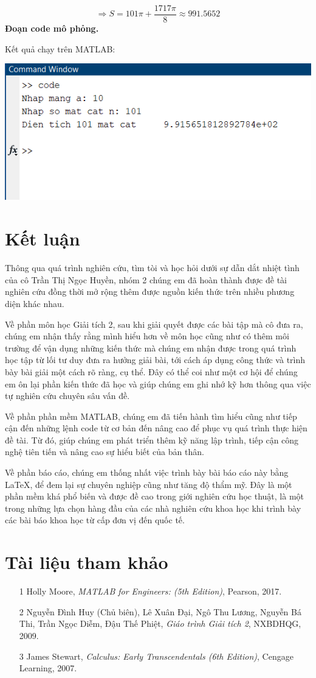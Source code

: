 \documentclass[12pt,a4paper]{article}
\begin{document}
\[
    \Rightarrow S = 101\pi + \dfrac{1717\pi}{8} \approx 991.5652   
\]
\textbf{Đoạn code mô phỏng.}

Kết quả chạy trên MATLAB: 
\begin{center}
    \includegraphics[scale = 0.8]{image.png}
\end{center}
\section{Kết luận}
Thông qua quá trình nghiên cứu, tìm tòi và học hỏi dưới sự dẫn dắt nhiệt tình của cô Trần Thị Ngọc Huyền, nhóm 2 chúng em đã hoàn thành được đề tài nghiên cứu đồng thời mở rộng thêm được nguồn kiến thức trên nhiều phương diện khác nhau.

Về phần môn học Giải tích 2, sau khi giải quyết được các bài tập mà cô đưa ra, chúng em nhận thấy rằng mình hiểu hơn về môn học cũng như có thêm môi trường để vận dụng những kiến thức mà chúng em nhận được trong quá trình học tập từ lối tư duy đưa ra hưởng giải bài, tới cách áp dụng công thức và trình bày bài giải một cách rõ ràng, cụ thể. Đây có thể coi như một cơ hội để chúng em ôn lại phần kiến thức đã học và giúp chúng em ghi nhớ kỹ hơn thông qua việc tự nghiên cứu chuyên sâu vấn đề.

Về phần phần mềm MATLAB, chúng em đã tiến hành tìm hiểu cũng như tiếp cận đến những lệnh code từ cơ bản đến nâng cao để phục vụ quá trình thực hiện đề tài. Từ đó, giúp chúng em phát triển thêm kỹ năng lập trình, tiếp cận công nghệ tiên tiến và nâng cao sự hiểu biết của bản thân. 

Về phần báo cáo, chúng em thống nhất việc trình bày bài báo cáo này bằng \LaTeX, để đem lại sự chuyên nghiệp cũng như tăng độ thẩm mỹ. Đây là một phần mềm khá phổ biến và được đề cao trong giới nghiên cứu học thuật, là một trong những lựa chọn hàng đầu của các nhà nghiên cứu khoa học khi trình bày các bài báo khoa học từ cấp đơn vị đến quốc tế.
\newpage
\section*{Tài liệu tham khảo}
\begin{itemize}
    \item[1] Holly Moore, \textit{MATLAB for Engineers: (5th Edition)}, Pearson, 2017.
    \item[2] Nguyễn Đình Huy (Chủ biên), Lê Xuân Đại, Ngô Thu Lương, Nguyễn Bá Thi, Trần Ngọc Diễm, Đậu Thế Phiệt, \textit{Giáo trình Giải tích 2}, NXBDHQG, 2009.
    \item[3] James Stewart, \textit{Calculus: Early Transcendentals (6th Edition)}, Cengage Learning, 2007.
\end{itemize}
\end{document}
